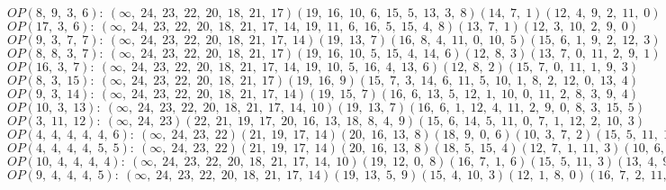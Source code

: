 $OP(8, \;9, \;3, \;6): \:(\infty, \;24, \;23, \;22, \;20, \;18, \;21, \;17)(19, \;16, \;10, \;6, \;15, \;5, \;13, \;3, \;8)(14, \;7, \;1)(12, \;4, \;9, \;2, \;11, \;0)$\\
$OP(17, \;3, \;6): \:(\infty, \;24, \;23, \;22, \;20, \;18, \;21, \;17, \;14, \;19, \;11, \;6, \;16, \;5, \;15, \;4, \;8)(13, \;7, \;1)(12, \;3, \;10, \;2, \;9, \;0)$\\
$OP(9, \;3, \;7, \;7): \:(\infty, \;24, \;23, \;22, \;20, \;18, \;21, \;17, \;14)(19, \;13, \;7)(16, \;8, \;4, \;11, \;0, \;10, \;5)(15, \;6, \;1, \;9, \;2, \;12, \;3)$\\
$OP(8, \;8, \;3, \;7): \:(\infty, \;24, \;23, \;22, \;20, \;18, \;21, \;17)(19, \;16, \;10, \;5, \;15, \;4, \;14, \;6)(12, \;8, \;3)(13, \;7, \;0, \;11, \;2, \;9, \;1)$\\
$OP(16, \;3, \;7): \:(\infty, \;24, \;23, \;22, \;20, \;18, \;21, \;17, \;14, \;19, \;10, \;5, \;16, \;4, \;13, \;6)(12, \;8, \;2)(15, \;7, \;0, \;11, \;1, \;9, \;3)$\\
$OP(8, \;3, \;15): \:(\infty, \;24, \;23, \;22, \;20, \;18, \;21, \;17)(19, \;16, \;9)(15, \;7, \;3, \;14, \;6, \;11, \;5, \;10, \;1, \;8, \;2, \;12, \;0, \;13, \;4)$\\
$OP(9, \;3, \;14): \:(\infty, \;24, \;23, \;22, \;20, \;18, \;21, \;17, \;14)(19, \;15, \;7)(16, \;6, \;13, \;5, \;12, \;1, \;10, \;0, \;11, \;2, \;8, \;3, \;9, \;4)$\\
$OP(10, \;3, \;13): \:(\infty, \;24, \;23, \;22, \;20, \;18, \;21, \;17, \;14, \;10)(19, \;13, \;7)(16, \;6, \;1, \;12, \;4, \;11, \;2, \;9, \;0, \;8, \;3, \;15, \;5)$\\
$OP(3, \;11, \;12): \:(\infty, \;24, \;23)(22, \;21, \;19, \;17, \;20, \;16, \;13, \;18, \;8, \;4, \;9)(15, \;6, \;14, \;5, \;11, \;0, \;7, \;1, \;12, \;2, \;10, \;3)$\\
$OP(4, \;4, \;4, \;4, \;4, \;6): \:(\infty, \;24, \;23, \;22)(21, \;19, \;17, \;14)(20, \;16, \;13, \;8)(18, \;9, \;0, \;6)(10, \;3, \;7, \;2)(15, \;5, \;11, \;1, \;12, \;4)$\\
$OP(4, \;4, \;4, \;4, \;5, \;5): \:(\infty, \;24, \;23, \;22)(21, \;19, \;17, \;14)(20, \;16, \;13, \;8)(18, \;5, \;15, \;4)(12, \;7, \;1, \;11, \;3)(10, \;6, \;0, \;9, \;2)$\\
$OP(10, \;4, \;4, \;4, \;4): \:(\infty, \;24, \;23, \;22, \;20, \;18, \;21, \;17, \;14, \;10)(19, \;12, \;0, \;8)(16, \;7, \;1, \;6)(15, \;5, \;11, \;3)(13, \;4, \;9, \;2)$\\
$OP(9, \;4, \;4, \;4, \;5): \:(\infty, \;24, \;23, \;22, \;20, \;18, \;21, \;17, \;14)(19, \;13, \;5, \;9)(15, \;4, \;10, \;3)(12, \;1, \;8, \;0)(16, \;7, \;2, \;11, \;6)$\\
